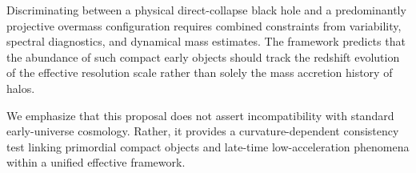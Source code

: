   Discriminating between a physical direct-collapse black hole and a
  predominantly projective overmass configuration requires combined
  constraints from variability, spectral diagnostics, and dynamical
  mass estimates.
  The framework predicts that the abundance of such compact early
  objects should track the redshift evolution of the effective
  resolution scale rather than solely the mass accretion history of halos.

  We emphasize that this proposal does not assert incompatibility
  with standard early-universe cosmology.
  Rather, it provides a curvature-dependent consistency test linking
  primordial compact objects and late-time low-acceleration phenomena
  within a unified effective framework.
